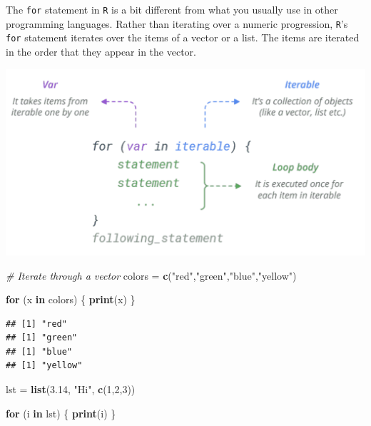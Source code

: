 \documentclass[
]{book}
\newenvironment{Shaded}{\begin{snugshade}}{\end{snugshade}}
\newcommand{\CommentTok}[1]{\textcolor[rgb]{0.56,0.35,0.01}{\textit{#1}}}
\newcommand{\ControlFlowTok}[1]{\textcolor[rgb]{0.13,0.29,0.53}{\textbf{#1}}}
\newcommand{\DecValTok}[1]{\textcolor[rgb]{0.00,0.00,0.81}{#1}}
\newcommand{\FloatTok}[1]{\textcolor[rgb]{0.00,0.00,0.81}{#1}}
\newcommand{\KeywordTok}[1]{\textcolor[rgb]{0.13,0.29,0.53}{\textbf{#1}}}
\newcommand{\NormalTok}[1]{#1}
\newcommand{\StringTok}[1]{\textcolor[rgb]{0.31,0.60,0.02}{#1}}
\begin{document}
The \texttt{for} statement in \texttt{R} is a bit different from what you usually use in other programming languages. Rather than iterating over a numeric progression, \texttt{R}'s \texttt{for} statement iterates over the items of a vector or a list. The items are iterated in the order that they appear in the vector.

\includegraphics[width=16.11in]{images/ForLoop}

\begin{Shaded}
\begin{Highlighting}[]
\CommentTok{# Iterate through a vector}
\NormalTok{colors =}\StringTok{ }\KeywordTok{c}\NormalTok{(}\StringTok{"red"}\NormalTok{,}\StringTok{"green"}\NormalTok{,}\StringTok{"blue"}\NormalTok{,}\StringTok{"yellow"}\NormalTok{)}

\ControlFlowTok{for}\NormalTok{ (x }\ControlFlowTok{in}\NormalTok{ colors) \{}
  \KeywordTok{print}\NormalTok{(x)}
\NormalTok{\}}
\end{Highlighting}
\end{Shaded}

\begin{verbatim}
## [1] "red"
## [1] "green"
## [1] "blue"
## [1] "yellow"
\end{verbatim}

\begin{Shaded}
\begin{Highlighting}[]
\NormalTok{lst =}\StringTok{ }\KeywordTok{list}\NormalTok{(}\FloatTok{3.14}\NormalTok{, }\StringTok{"Hi"}\NormalTok{, }\KeywordTok{c}\NormalTok{(}\DecValTok{1}\NormalTok{,}\DecValTok{2}\NormalTok{,}\DecValTok{3}\NormalTok{))}

\ControlFlowTok{for}\NormalTok{ (i }\ControlFlowTok{in}\NormalTok{ lst) \{}
  \KeywordTok{print}\NormalTok{(i)}
\NormalTok{\}}
\end{Highlighting}
\end{Shaded}
\end{document}
